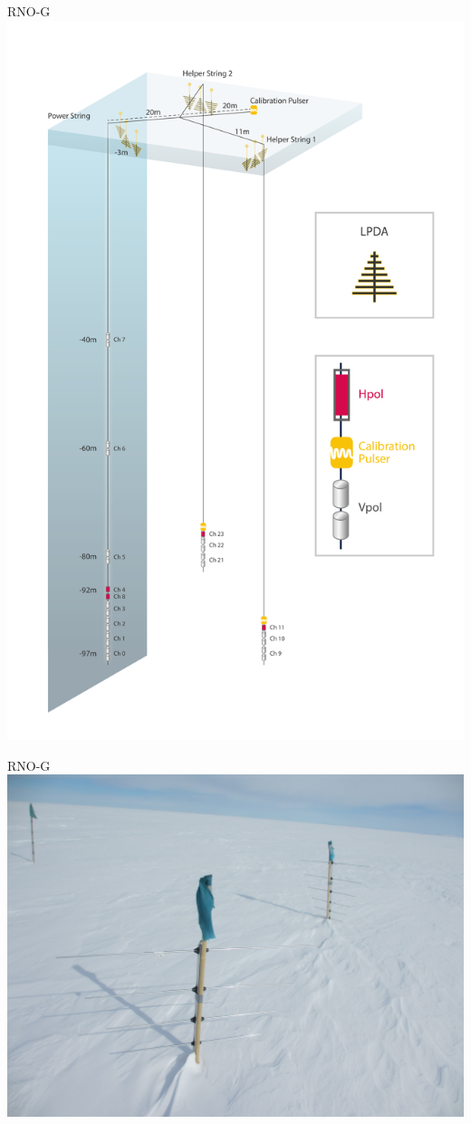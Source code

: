 \documentclass{beamer}
\begin{document}
\begin{frame}{RNO-G}
  \centering
  \includegraphics[height=0.9\textheight]{figures/detector.pdf}
\end{frame}
\begin{frame}{RNO-G}
  \centering
  \includegraphics[height=0.8\textheight]{figures/highlight.jpg}
\end{frame}
\end{document}
